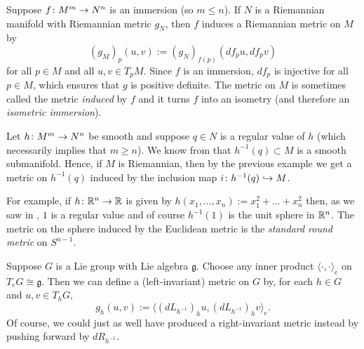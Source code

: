\begin{example}
	Suppose $f \colon\thinspace\! M^m \to N^n$ is an immersion (so $m \leq n$). If $N$ is a Riemannian manifold with Riemannian metric $g_N$, then $f$ induces a Riemannian metric on $M$ by
	\[
		(g_M)_p(u,v) := (g_N)_{f(p)}(df_p u, df_p v)
	\]
	for all $p \in M$ and all $u,v \in T_pM$. Since $f$ is an immersion, $df_p$ is injective for all $p \in M$, which ensures that $g$ is positive definite. The metric on $M$ is sometimes called the metric \emph{induced} by $f$ and it turns $f$ into an isometry (and therefore an \emph{isometric immersion}).
\end{example}

\begin{example}
	Let $h \colon\thinspace\! M^m \to N^n$ be smooth and suppose $q \in N$ is a regular value of $h$ (which necessarily implies that $m \geq n$). We know from  that $h^{-1}(q) \subset M$ is a smooth submanifold. Hence, if $M$ is Riemannian, then by the previous example we get a metric on $h^{-1}(q)$ induced by the inclusion map $i \colon\thinspace\! h^{-1}(q) \hookrightarrow M$. 
	
	For example, if $h \colon\thinspace\! \mathbb{R}^n \to \mathbb{R}$ is given by $h(x_1, \dots , x_n) := x_1^2 + \dots + x_n^2$ then, as we saw in , $1$ is a regular value and of course $h^{-1}(1)$ is the unit sphere in $\mathbb{R}^n$. The metric on the sphere induced by the Euclidean metric is the \emph{standard round metric} on $S^{n-1}$.
\end{example}

\begin{example}\label{ex:left-invariant metrics}
	Suppose $G$ is a Lie group with Lie algebra $\mathfrak{g}$. Choose any inner product $\langle  \cdot , \cdot \rangle_e$ on $T_e G \cong \mathfrak{g}$. Then we can define a (left-invariant) metric on $G$ by, for each $h \in G$ and $u,v \in T_hG$,
	\[
		g_h(u,v) := \langle \left(dL_{h^{-1}}\right)_h u, \left(dL_{h^{-1}}\right)_h v \rangle_e.
	\]
	Of course, we could just as well have produced a right-invariant metric instead by pushing forward by $dR_{h^{-1}}$.
\end{example}

